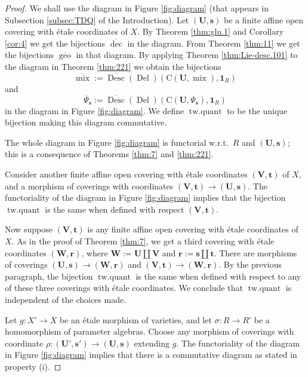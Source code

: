 \documentclass[a4paper, 10pt]{amsart}
\theoremstyle{definition}
\numberwithin{equation}{section}
\newcommand{\opn}{\operatorname}
\newcommand{\ol}{\overline}
\newcommand{\mrm}[1]{\mathrm{#1}}
\newcommand{\bsym}[1]{\boldsymbol{#1}}
\begin{document}
\begin{proof}
We shall use the diagram in Figure \ref{fig:diagram}
(that appears in Subsection \ref{subsec:TDQ} of the Introduction).  
Let $(\bsym{U}, \bsym{s})$ be a finite affine open covering with \'etale
coordinates of $X$.
By Theorem \ref{thm:glu.1} and Corollary \ref{cor:4} we get the bijections
$\ol{\opn{dec}}$ in the diagram.
{}From Theorem \ref{thm:11} we get the bijections $\ol{\opn{geo}}$ in that
diagram. By applying Theorem \ref{thm:Lie-desc.101} to the diagram in Theorem 
\ref{thm:221} we obtain the bijections 
\[ \ol{\opn{mix}} := 
\ol{\opn{Desc}} (\opn{Del}) ( \mrm{C}(\bsym{U}, \opn{mix}), \bsym{1}_R) \]
and 
\[ \ol{\Psi}_{\bsym{s}} := 
\ol{\opn{Desc}} (\opn{Del}) (\mrm{C}(\bsym{U}, \Psi_{\bsym{s}}), \bsym{1}_R)
\]
in the diagram in Figure \ref{fig:diagram}.
We define $\opn{tw{.}quant}$ to be the unique bijection making this diagram
commutative. 

The whole diagram in Figure \ref{fig:diagram} is
functorial w.r.t.\ $R$ and $(\bsym{U}, \bsym{s})$; this is a consequence of
Theorems \ref{thm:7} and \ref{thm:221}.

Consider another finite affine open covering with \'etale coordinates
$(\bsym{V}, \bsym{t})$ of $X$, and a morphism of coverings with coordinates
$(\bsym{V}, \bsym{t}) \to (\bsym{U}, \bsym{s})$. 
The functoriality of the diagram in Figure \ref{fig:diagram} implies that 
the bijection $\opn{tw{.}quant}$ is the same when defined with respect 
$(\bsym{V}, \bsym{t})$.

Now suppose $(\bsym{V}, \bsym{t})$ is any finite affine open covering with
\'etale coordinates of $X$. As in the proof of Theorem \ref{thm:7}, 
we get a third covering with \'etale coordinates
$(\bsym{W}, \bsym{r})$, where 
$\bsym{W} := \bsym{U} \coprod \bsym{V}$ and  
$\bsym{r} := \bsym{s} \coprod \bsym{t}$. There are morphisms of coverings 
$(\bsym{U}, \bsym{s}) \to (\bsym{W}, \bsym{r})$
and $(\bsym{V}, \bsym{t}) \to (\bsym{W}, \bsym{r})$.
By the previous paragraph, the bijection $\opn{tw{.}quant}$ is the same when
defined with respect to any of these three coverings with \'etale coordinates.
We conclude that $\opn{tw{.}quant}$ is independent of the choices made. 

Let  $g : X' \to X$ be an \'etale morphism of varieties, and let
$\sigma : R \to R'$ be a homomorphism of parameter algebras. Choose any
morphism of coverings with coordinate 
$\rho : (\bsym{U}', \bsym{s}') \to (\bsym{U}, \bsym{s})$
extending $g$. The functoriality of the diagram in Figure \ref{fig:diagram}
implies that there is a commutative diagram as stated in property (i). 


\end{proof}
\end{document}
